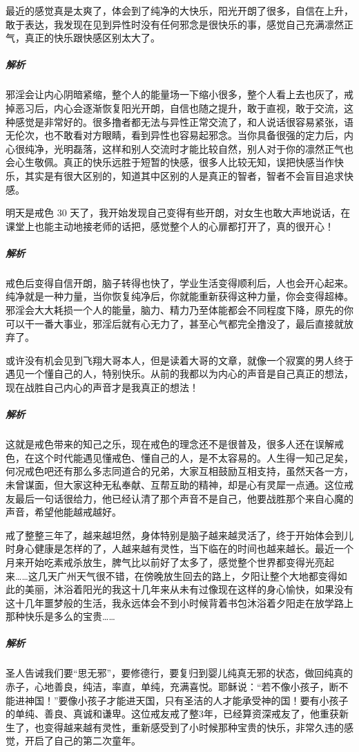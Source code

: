 \begin{case}
    最近的感觉真是太爽了，体会到了纯净的大快乐，阳光开朗了很多，自信在上升，敢于表达，我发现在见到异性时没有任何邪念是很快乐的事，感觉自己充满凛然正气，真正的快乐跟快感区别太大了。
    \subparagraph{解析} 邪淫会让内心阴暗紧缩，整个人的能量场一下缩小很多，整个人看上去也灰了，戒掉恶习后，内心会逐渐恢复阳光开朗，自信也随之提升，敢于直视，敢于交流，这种感觉是非常好的。很多撸者都无法与异性正常交流了，和人说话很容易紧张，语无伦次，也不敢看对方眼睛，看到异性也容易起邪念。当你具备很强的定力后，内心很纯净，光明磊落，这样和别人交流时才能比较自然，别人对于你的凛然正气也会心生敬佩。真正的快乐远胜于短暂的快感，很多人比较无知，误把快感当作快乐，其实是有很大区别的，知道其中区别的人是真正的智者，智者不会盲目追求快感。
\end{case}

\begin{case}
    明天是戒色 30 天了，我开始发现自己变得有些开朗，对女生也敢大声地说话，在课堂上也能主动地接老师的话把，感觉整个人的心扉都打开了，真的很开心！
    \subparagraph{解析} 戒色后变得自信开朗，脑子转得也快了，学业生活变得顺利后，人也会开心起来。纯净就是一种力量，当你恢复纯净后，你就能重新获得这种力量，你会变得超棒。邪淫会大大耗损一个人的能量，脑力、精力乃至体能都会不同程度下降，原先的你可以干一番大事业，邪淫后就有心无力了，甚至心气都完全撸没了，最后直接就放弃了。
\end{case}

\begin{case}[知己之乐]
    或许没有机会见到飞翔大哥本人，但是读着大哥的文章，就像一个寂寞的男人终于遇见一个懂自己的人，特别快乐。从前的我都以为内心的声音是自己真正的想法，现在战胜自己内心的声音才是我真正的想法！
    \subparagraph{解析} 这就是戒色带来的知己之乐，现在戒色的理念还不是很普及，很多人还在误解戒色，在这个时代能遇见懂戒色、懂自己的人，是不太容易的。人生得一知己足矣，何况戒色吧还有那么多志同道合的兄弟，大家互相鼓励互相支持，虽然天各一方，未曾谋面，但大家这种无私奉献、互帮互助的精神，却是心有灵犀一点通。这位戒友最后一句话很给力，他已经认清了那个声音不是自己，他要战胜那个来自心魔的声音，希望他能越戒越好。
\end{case}

\begin{case}
    戒了整整三年了，越来越坦然，身体特别是脑子越来越灵活了，终于开始体会到儿时身心健康是怎样的了，人越来越有灵性，当下临在的时间也越来越长。最近一个月来开始吃素戒杀放生，脾气比以前好了太多了，感觉整个世界都变得光亮起来……这几天广州天气很不错，在傍晚放生回去的路上，夕阳让整个大地都变得如此的美丽，沐浴着阳光的我这十几年来从未有过像现在这样的身心愉快，如果没有这十几年噩梦般的生活，我永远体会不到小时候背着书包沐浴着夕阳走在放学路上那种快乐是多么的宝贵……
    \subparagraph{解析} 圣人告诫我们要“思无邪”，要修德行，要复归到婴儿纯真无邪的状态，做回纯真的赤子，心地善良，纯洁，率直，单纯，充满喜悦。耶稣说：“若不像小孩子，断不能进神国！”要像小孩子才能进天国，只有圣洁的人才能承受神的国！要有小孩子的单纯、善良、真诚和谦卑。这位戒友戒了整3年，已经算资深戒友了，他重获新生了，也变得越来越有灵性，重新感受到了小时候那种宝贵的快乐，非常久违的感觉，开启了自己的第二次童年。
\end{case}

